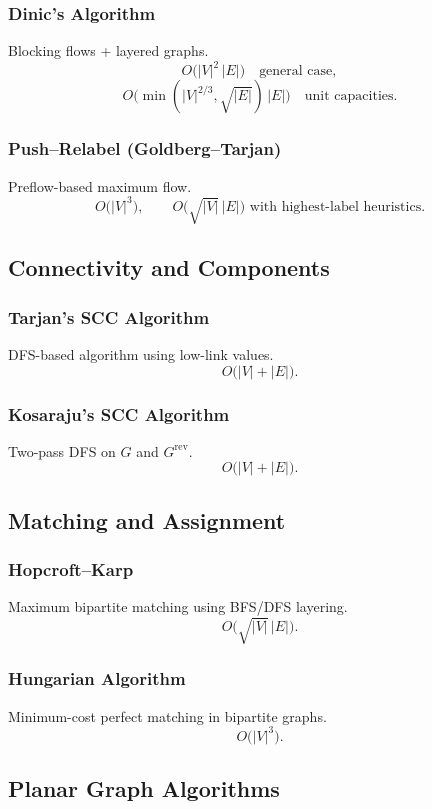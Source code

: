 \documentclass[9pt]{extarticle}
\begin{document}
\subsubsection{Dinic's Algorithm}
Blocking flows + layered graphs.
\[
O\bigl(|V|^{2} \, |E|\bigr) \quad \text{general case},
\]
\[
O\bigl(\min(|V|^{2/3}, \sqrt{|E|}) \, |E|\bigr) \quad \text{unit capacities}.
\]

\subsubsection{Push--Relabel (Goldberg--Tarjan)}
Preflow-based maximum flow.
\[
O\bigl(|V|^{3}\bigr),
\qquad 
O\bigl(\sqrt{|V|} \, |E|\bigr) \text{ with highest-label heuristics}.
\]

\subsection{Connectivity and Components}

\subsubsection{Tarjan's SCC Algorithm}
DFS-based algorithm using low-link values.
\[
O\bigl(|V| + |E|\bigr).
\]

\subsubsection{Kosaraju's SCC Algorithm}
Two-pass DFS on $G$ and $G^{\mathrm{rev}}$.
\[
O\bigl(|V| + |E|\bigr).
\]

\subsection{Matching and Assignment}

\subsubsection{Hopcroft--Karp}
Maximum bipartite matching using BFS/DFS layering.
\[
O\bigl(\sqrt{|V|}\, |E|\bigr).
\]

\subsubsection{Hungarian Algorithm}
Minimum-cost perfect matching in bipartite graphs.
\[
O\bigl(|V|^{3}\bigr).
\]

\subsection{Planar Graph Algorithms}
\end{document}
